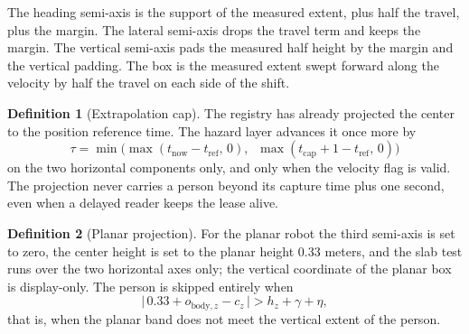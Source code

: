 \documentclass[10pt,a4paper]{article}
\theoremstyle{plain}
\theoremstyle{definition}
\newtheorem{definition}{Definition}[section]
\theoremstyle{remark}
\begin{document}
The heading semi-axis is the support of the measured extent, plus half the travel, plus the margin. The lateral semi-axis drops the travel term and keeps the margin. The vertical semi-axis pads the measured half height by the margin and the vertical padding. The box is the measured extent swept forward along the velocity by half the travel on each side of the shift.

\begin{definition}[Extrapolation cap]\label{def:cap}
The registry has already projected the center to the position reference time. The hazard layer advances it once more by
\begin{equation}
\tau = \min\bigl(\max(t_{\mathrm{now}} - t_{\mathrm{ref}},\, 0),\;\; \max(t_{\mathrm{cap}} + 1 - t_{\mathrm{ref}},\, 0)\bigr)
\end{equation}
on the two horizontal components only, and only when the velocity flag is valid. The projection never carries a person beyond its capture time plus one second, even when a delayed reader keeps the lease alive.
\end{definition}

\begin{definition}[Planar projection]\label{prop:planar}
For the planar robot the third semi-axis is set to zero, the center height is set to the planar height 0.33 meters, and the slab test runs over the two horizontal axes only; the vertical coordinate of the planar box is display-only. The person is skipped entirely when
\begin{equation}
\bigl|\,0.33 + o_{\mathrm{body},z} - c_z\,\bigr| > h_z + \gamma + \eta,
\end{equation}
that is, when the planar band does not meet the vertical extent of the person.
\end{definition}
\end{document}
